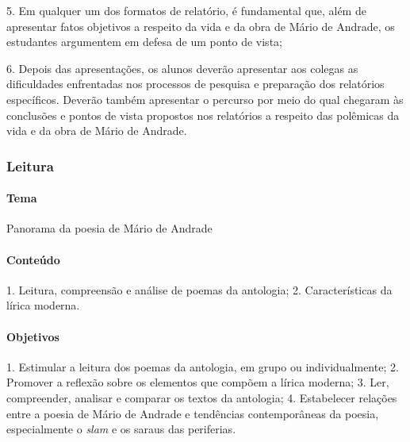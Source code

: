 \documentclass[11pt]{extarticle}
\begin{document}
\vspace{3mm}

5. Em qualquer um dos formatos de relatório, é fundamental que, além de
apresentar fatos objetivos a respeito da vida e da obra de Mário de
Andrade, os estudantes argumentem em defesa de um ponto de vista;

\vspace{3mm}

6. Depois das apresentações, os alunos deverão apresentar aos colegas as
dificuldades enfrentadas nos processos de pesquisa e preparação dos
relatórios específicos. Deverão também apresentar o percurso por meio do
qual chegaram às conclusões e pontos de vista propostos nos relatórios a
respeito das polêmicas da vida e da obra de Mário de Andrade.

\subsubsection{Leitura}


\paragraph{Tema} Panorama da poesia de Mário de Andrade

\paragraph{Conteúdo} 1. Leitura, compreensão e análise de poemas da
antologia; 2. Características da lírica moderna.

\paragraph{Objetivos} 1. Estimular a leitura dos poemas da antologia, em
grupo ou individualmente; 2. Promover a reflexão sobre os elementos que
compõem a lírica moderna; 3. Ler, compreender, analisar e comparar os
textos da antologia; 4. Estabelecer relações entre a poesia de Mário de
Andrade e tendências contemporâneas da poesia, especialmente o
\emph{slam} e os saraus das periferias.
\end{document}
